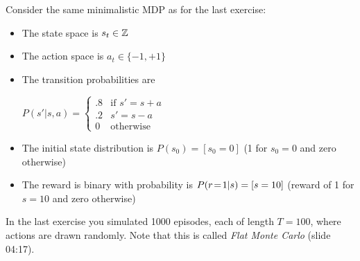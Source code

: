 Consider the same minimalistic MDP as for the last exercise:
\begin{itemize}
\item The state space is $s_t \in \ZZZ$
\item The action space is $a_t \in\{-1, +1\}$
\item The transition probabilities are

$P(s'|s,a) = \begin{cases} .8
& \text{if~} s'=s+a \\ .2 & s'=s-a \\ 0
& \text{otherwise}\end{cases}$
\item The initial state distribution is $P(s_0) = [s_0=0]$ (1 for $s_0=0$ and
zero otherwise)
\item The reward is binary with probability is $P(r\=1|s) = [s=10]$
(reward of 1 for $s=10$ and zero otherwise)
\end{itemize}

In the last exercise you simulated 1000 episodes, each of length
$T=100$, where actions are drawn randomly. Note that this is
called \emph{Flat Monte Carlo} (slide 04:17).

